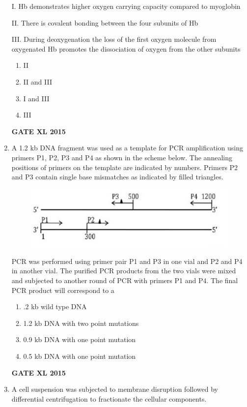 \documentclass[journal,12pt,onecolumn]{IEEEtran}
\begin{document}
\begin{enumerate}
I. Hb demonstrates higher oxygen carrying capacity compared to myoglobin

II. There is covalent bonding between the four subunits of Hb

III. During deoxygenation the loss of the first oxygen molecule from oxygenated Hb promotes the dissociation of oxygen from the other subunits
    \begin{enumerate}
            \item II
	    \item II and III
	    \item I and III
            \item III
	\end{enumerate}
\hfill{\textbf{GATE XL 2015}}
\item A 1.2 kb DNA fragment was used as a template for PCR amplification using primers P1, P2, P3 and P4 as shown in the scheme below. The annealing positions of primers on the template are indicated by numbers. Primers P2 and P3 contain single base mismatches as indicated by filled triangles.
	
	\begin{figure}[h!]
		\centering
    \includegraphics[width=\columnwidth]{43}
		    \caption*{}
		\label{fig:Q43}
	\end{figure}
PCR was performed using primer pair P1 and P3 in one vial and P2 and P4 in another vial. The purified PCR products from the two vials were mixed and subjected to another round of PCR with primers P1 and P4. The final PCR product will correspond to a

    \begin{enumerate}
            \item .2 kb wild type DNA
	    \item  1.2 kb DNA with two point mutations
	    \item  0.9 kb DNA with one point mutation
            \item 0.5 kb DNA with one point mutation
    \end{enumerate}
\hfill{\textbf{GATE XL 2015}}
\item A cell suspension was subjected to membrane disruption followed by differential centrifugation to fractionate the cellular components.


\end{enumerate}
\end{document}
